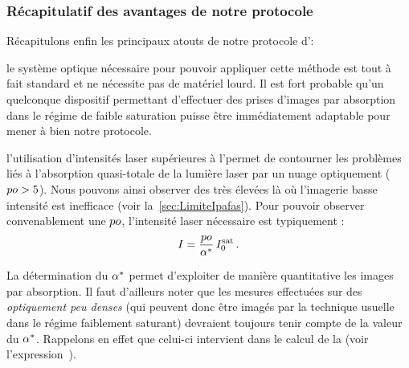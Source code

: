 \subsubsection{Récapitulatif des avantages de notre protocole}
Récapitulons enfin les principaux atouts de notre protocole d'\ipadrfs:
\begin{ditemize}
	\item le système optique nécessaire pour pouvoir appliquer cette méthode est tout à fait standard et ne nécessite pas de matériel lourd. Il est fort probable qu'un quelconque dispositif permettant d'effectuer des prises d'images par absorption dans le régime de faible saturation puisse être immédiatement adaptable pour mener à bien notre protocole. 
	\vspace{5pt}
	\item l'utilisation d'intensités laser supérieures à l'\intsat permet de contourner les problèmes liés à l'absorption quasi-totale de la lumière laser par un nuage optiquement  (${ po} > 5$). Nous pouvons ainsi observer des \pros très élevées là où l'imagerie basse intensité est inefficace (voir la~\autoref{sec:LimiteIpafas}). Pour pouvoir observer convenablement une \pro ${ po}$, l'intensité laser nécessaire est typiquement : 
\[
{I} = \frac{{ po}}{{{\alpha}^{*}}} \, {I^{\rm sat}_{0}}
\, .
\]
	\item La détermination du \pdc ${{\alpha}^{*}}$ permet d'exploiter de manière quantitative les images par absorption. Il faut d'ailleurs noter que les mesures effectuées sur des \nats \emph{optiquement peu denses} (qui peuvent donc être imagés par la technique usuelle dans le régime faiblement saturant) devraient toujours tenir compte de la valeur du \pdc ${{\alpha}^{*}}$. Rappelons en effet que celui-ci intervient dans le calcul de la \dcol (voir l'expression~).
\end{ditemize}







